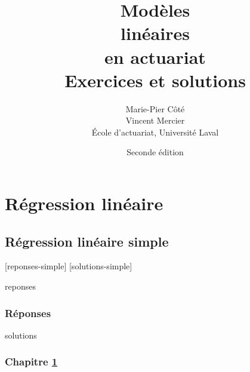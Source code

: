 \documentclass[letterpaper,10pt]{memoir}\usepackage[]{graphicx}\usepackage[]{color}
\title{\HUGE
    \fontseries{ub}\selectfont Modèles \\
    \fontseries{ub}\selectfont linéaires\\
    \fontseries{ub}\selectfont en actuariat \\[0.5\baselineskip]
    \huge\fontseries{m}\selectfont Exercices et solutions}
\author{\LARGE Marie-Pier Côté \\[3mm]
          \LARGE Vincent Mercier \\[3mm]
    \large École d'actuariat, Université Laval}
\date{\large Seconde édition}
\begin{document}



\frontmatter

\pagestyle{empty}


\pagestyle{companion}



\cleardoublepage
\tableofcontents*

\mainmatter

\part{Régression linéaire}



\chapter{Régression linéaire simple}
\label{chap:simple}

[reponses-simple]
[solutions-simple]

\begin{Filesave}{reponses}
\bigskip
\section*{Réponses}

\end{Filesave}

\begin{Filesave}{solutions}
\section*{Chapitre \ref{chap:simple}}

\end{Filesave}
\end{document}
